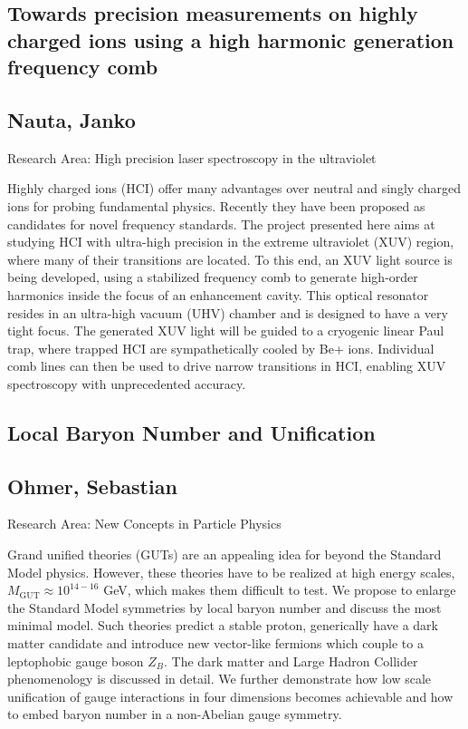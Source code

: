 \subsection*{\centering \large Towards precision measurements on highly charged ions using a high harmonic generation frequency comb}
\subsection*{\centering \normalsize Nauta, Janko}
Research Area: High precision laser spectroscopy in the ultraviolet\newline

\noindent Highly charged ions (HCI) offer many advantages over neutral and singly charged ions for probing fundamental physics. Recently they have been proposed as candidates for novel frequency standards. The project presented here aims at studying HCI with ultra-high precision in the extreme ultraviolet (XUV) region, where many of their transitions are located. To this end, an XUV light source is being developed, using a stabilized frequency comb to generate high-order harmonics inside the focus of an enhancement cavity. This optical resonator resides in an ultra-high vacuum (UHV) chamber and is designed to have a very tight focus. The generated XUV light will be guided to a cryogenic linear Paul trap, where trapped HCI are sympathetically cooled by Be+ ions. Individual comb lines can then be used to drive narrow transitions in HCI, enabling XUV spectroscopy with unprecedented accuracy.

\subsection*{\centering \large Local Baryon Number and Unification}
\subsection*{\centering \normalsize Ohmer, Sebastian}
Research Area: New Concepts in Particle Physics\newline

\noindent  Grand unified theories (GUTs) are an appealing idea for beyond the Standard Model physics. However, these theories have to be realized at high energy scales, $M_\text{GUT} \approx 10^{14-16}$ GeV, which makes them difficult to test. We propose to enlarge the Standard Model symmetries by local baryon number and discuss the most minimal model. Such theories predict a stable proton, generically have a dark matter candidate and introduce new vector-like fermions which couple to a leptophobic gauge boson $Z_B$. The dark matter and Large Hadron Collider phenomenology is discussed in detail. We further demonstrate how low scale unification of gauge interactions in four dimensions becomes achievable and how to embed baryon number in a non-Abelian gauge symmetry. 
\newpage
